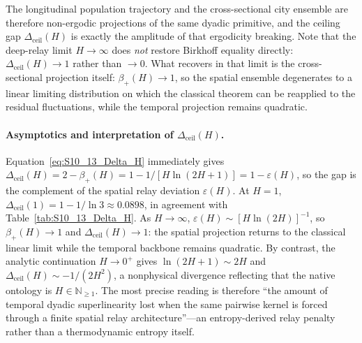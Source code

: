 \documentclass[11pt]{article}
\begin{document}
The longitudinal population trajectory and the cross-sectional city ensemble are therefore non-ergodic projections of the same dyadic primitive, and the ceiling gap $\Delta_{\mathrm{ceil}}(H)$ is exactly the amplitude of that ergodicity breaking.  Note that the deep-relay limit $H\to\infty$ does \emph{not} restore Birkhoff equality directly: $\Delta_{\mathrm{ceil}}(H)\to 1$ rather than $\to 0$.  What recovers in that limit is the cross-sectional projection itself: $\beta_+(H)\to 1$, so the spatial ensemble degenerates to a linear limiting distribution on which the classical theorem can be reapplied to the residual fluctuations, while the temporal projection remains quadratic.

\paragraph{Asymptotics and interpretation of $\Delta_{\mathrm{ceil}}(H)$.}
Equation~\eqref{eq:S10_13_Delta_H} immediately gives
$\Delta_{\mathrm{ceil}}(H)=2-\beta_+(H)=1-1/[H\ln(2H{+}1)]=1-\varepsilon(H)$,
so the gap is the complement of the spatial relay deviation $\varepsilon(H)$.
At $H{=}1$, $\Delta_{\mathrm{ceil}}(1)=1-1/\ln 3\approx 0.0898$, in agreement with
Table~\ref{tab:S10_13_Delta_H}. As $H\to\infty$, $\varepsilon(H)\sim[H\ln(2H)]^{-1}$,
so $\beta_+(H)\to 1$ and $\Delta_{\mathrm{ceil}}(H)\to 1$: the spatial projection
returns to the classical linear limit while the temporal backbone remains quadratic.
By contrast, the analytic continuation $H\to 0^+$ gives $\ln(2H{+}1)\sim 2H$ and
$\Delta_{\mathrm{ceil}}(H)\sim -1/(2H^2)$, a nonphysical divergence reflecting that
the native ontology is $H\in\mathbb{N}_{\ge 1}$. The most precise reading is therefore
``the amount of temporal dyadic superlinearity lost when the same pairwise kernel
is forced through a finite spatial relay architecture''---an entropy-derived relay
penalty rather than a thermodynamic entropy itself.

\end{document}
